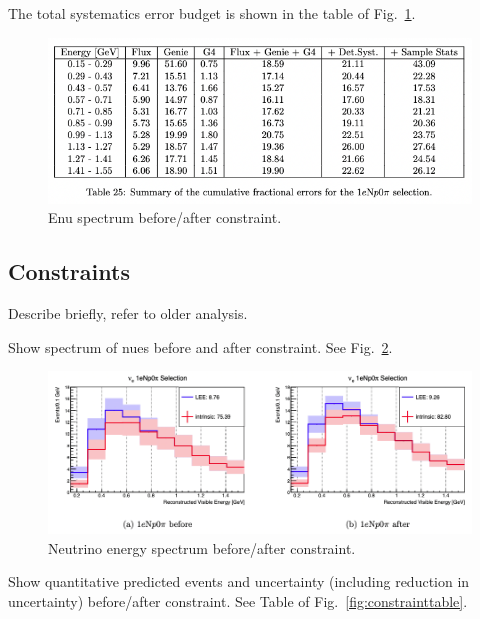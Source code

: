 The total systematics error budget is shown in the table of Fig.~\ref{fig:systematicsbudget}.

\begin{center}
\begin{figure}[h]
    \includegraphics[width=1.00\textwidth]{technote/SystematicsSensitivity/Figures/systematicsbudget.png}
    \caption{Enu spectrum before/after constraint.}
    \label{fig:systematicsbudget}
\end{figure}
\end{center}

\newpage
\subsection{Constraints}
Describe briefly, refer to older analysis.

Show spectrum of nues before and after constraint. See Fig.~\ref{fig:constraint}.

\begin{center}
\begin{figure}[h]
    \includegraphics[width=1.00\textwidth]{technote/SystematicsSensitivity/Figures/constraint.png}
    \caption{Neutrino energy spectrum before/after constraint.}
    \label{fig:constraint}
\end{figure}
\end{center}

Show quantitative predicted events and uncertainty (including reduction in uncertainty) before/after constraint. See Table of Fig.~\ref{fig:constrainttable}.


